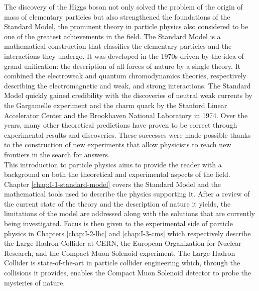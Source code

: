 The discovery of the Higgs boson not only solved the problem of the origin of mass of elementary particles but also strengthened the foundations of the Standard Model, the prominent theory in particle physics also considered to be one of the greatest achievements in the field. The Standard Model is a mathematical construction that classifies the elementary particles and the interactions they undergo. It was developed in the 1970s driven by the idea of grand unification: the description of all forces of nature by a single theory. It combined the electroweak and quantum chromodynamics theories, respectively describing the electromagnetic and weak, and strong interactions. The Standard Model quickly gained credibility with the discoveries of neutral weak currents by the Gargamelle experiment and the charm quark by the Stanford Linear Accelerator Center and the Brookhaven National Laboratory in 1974. Over the years, many other theoretical predictions have proven to be correct through experimental results and discoveries. These successes were made possible thanks to the construction of new experiments that allow physicists to reach new frontiers in the search for answers. \\

This introduction to particle physics aims to provide the reader with a background on both the theoretical and experimental aspects of the field. Chapter \ref{chap:I-1-standard-model} covers the Standard Model and the mathematical tools used to describe the physics supporting it. After a review of the current state of the theory and the description of nature it yields, the limitations of the model are addressed along with the solutions that are currently being investigated. Focus is then given to the experimental side of particle physics in Chapters \ref{chap:I-2-lhc} and \ref{chap:I-3-cms} which respectively describe the Large Hadron Collider at CERN, the European Organization for Nuclear Research, and the Compact Muon Solenoid experiment. The Large Hadron Collider is state-of-the-art in particle collider engineering which, through the collisions it provides, enables the Compact Muon Solenoid detector to probe the mysteries of nature.
